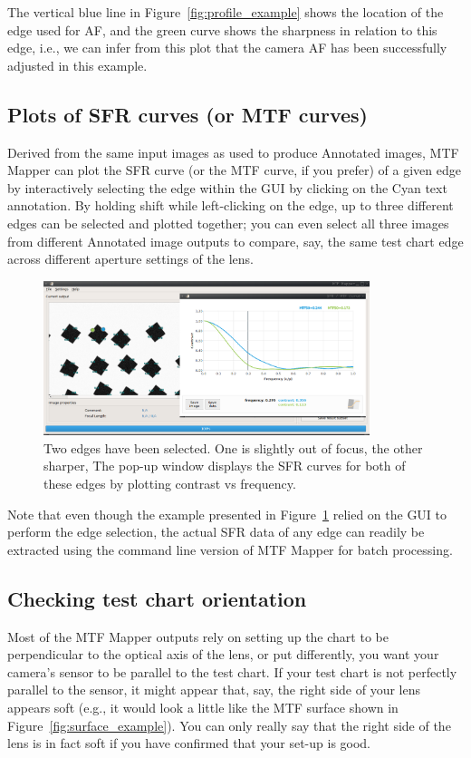 \documentclass[a4paper]{article}
\begin{document}
The vertical blue line in Figure~\ref{fig:profile_example} shows the
location of the edge used for AF, and the green curve shows the sharpness in
relation to this edge, i.e., we can infer from this plot that the camera AF
has been successfully adjusted in this example.

\newpage

\subsection{Plots of SFR curves (or MTF curves)}
\label{sec:sfr_curve}
Derived from the same input images as used to produce \textsf{Annotated
images}, MTF Mapper can plot the SFR curve (or the MTF curve, if you prefer)
of a given edge by interactively selecting the edge within the GUI by
clicking on the Cyan text annotation. By holding shift while left-clicking
on the edge, up to three different edges can be selected and plotted
together; you can even select all three images from different
\textsf{Annotated image} outputs to compare, say, the same test chart edge
across different aperture settings of the lens.

\begin{figure}[!hb]
\centering
\includegraphics[width=0.85\textwidth]{figures/sfr_example}
\caption{Two edges have been selected. One is slightly out of focus, the other sharper,
The pop-up window displays the SFR curves for both of these
edges by plotting contrast vs frequency.}
\label{fig:sfr_example}
\end{figure}

Note that even though the example presented in Figure~\ref{fig:sfr_example}
relied on the GUI to perform the edge selection, the actual SFR data of any 
edge can readily be extracted using the command line version of MTF Mapper 
for batch processing.

\newpage

\subsection{Checking test chart orientation}
\label{sec:chart_orientation}
Most of the MTF Mapper outputs rely on setting up the chart to be
perpendicular to the optical axis of the lens, or put differently, you want
your camera's sensor to be parallel to the test chart. If your test chart is not
perfectly parallel to the sensor, it might appear that, say, the right side of
your lens appears soft (e.g., it would look a little like the MTF surface
shown in Figure~\ref{fig:surface_example}). You can only really say that the
right side of the lens is in fact soft if you have confirmed that your
set-up is good.
\end{document}
